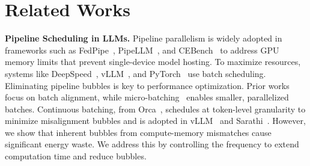 \section{Related Works}
\label{sec:relatedworks}


\textbf{Pipeline Scheduling in LLMs.} 
Pipeline parallelism is widely adopted in frameworks such as FedPipe~\cite{fang2024automated}, PipeLLM~\cite{ma2023poster}, and CEBench~\cite{sun2024cebench} to address GPU memory limits that prevent single-device model hosting.
To maximize resources, systems like DeepSpeed~\cite{aminabadi2022deepspeed}, vLLM~\cite{kwon2023efficient}, and PyTorch~\cite{paszke2019pytorch} use batch scheduling.
Eliminating pipeline bubbles is key to performance optimization.
Prior works~\cite{arfeen2024pipefill, zheng2024response, lin2024syncintellects} focus on batch alignment, while micro-batching~\cite{athlur2022varuna, narayanan2019pipedream} enables smaller, parallelized batches.
Continuous batching, from Orca~\cite{yu2022orca}, schedules at token-level granularity to minimize misalignment bubbles and is adopted in vLLM~\cite{kwon2023efficient} and Sarathi~\cite{agrawal2024taming}.
However, we show that inherent bubbles from compute-memory mismatches cause significant energy waste.
We address this by controlling the frequency to extend computation time and reduce bubbles.

